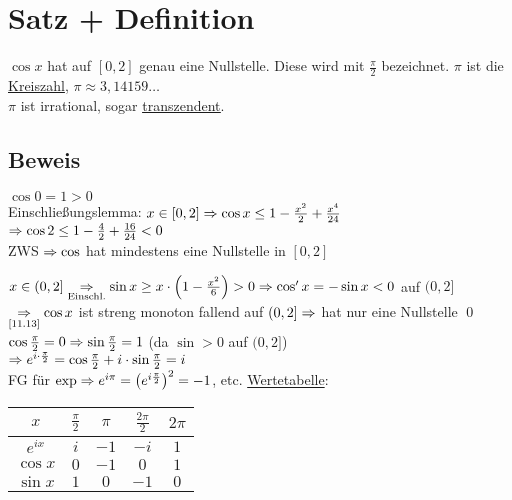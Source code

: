 \section{Satz + Definition}\label{12.1}
$\cos x$ hat auf $[0,2]$ genau eine Nullstelle. Diese wird mit $\frac{\pi}{2}$ bezeichnet.\nl
$\pi$ ist die \underline{Kreiszahl}, $\pi \approx 3,14159\ldots$\\
$\pi$ ist irrational, sogar \href{https://de.wikipedia.org/wiki/Transzendente_Zahl}{\underline{transzendent}}.

\newpage

\subsection*{Beweis}
$\cos 0 = 1 > 0$\\
Einschließungslemma: $x \in [0,2] \Rightarrow \cos x \le 1 - \frac{x^2}{2} + \frac{x^4}{24}$\\
$\Rightarrow \cos 2 \le 1 - \frac{4}{2} + \frac{16}{24} < 0$\\
ZWS $\Rightarrow \cos$ hat mindestens eine Nullstelle in $[0,2]$\nl
{}\nl
$x \in (0,2] \underset{\text{Einschl.}}{\Rightarrow} \sin x \ge x \cdot \left(1-\frac{x^2}{6}\right) > 0 \Rightarrow \cos'x = - \sin x < 0$ auf $(0,2]$\\
$\underset{\text{\ref{11.13}}}{\Rightarrow} \cos x$ ist streng monoton fallend auf $(0,2] \Rightarrow$ hat nur eine Nullstelle \qed\nl
$\cos \frac{\pi}{2} = 0 \Rightarrow \sin \frac{\pi}{2} = 1$ (da $\sin > 0$ auf $(0,2]$)\\
$\Rightarrow e^{i \cdot \frac{\pi}{2}} = \cos \frac{\pi}{2} + i \cdot \sin \frac{\pi}{2} = i$\\
FG für $\exp \Rightarrow e^{i \pi} = \left(e^{i \frac{\pi}{2}}\right)^2 = -1$, etc.\nl
\underline{Wertetabelle}:\\
\begin{tabular}{c||c|c|c|c}
$x$ & $\frac{\pi}{2}$ & $\pi$ & $\frac{2 \pi}{2}$ & $2 \pi$ \\ 
\hline $e^{ix}$ & $i$ & $-1$ & $-i$ & $1$ \\ 
\hline $\cos x$ & $0$ & $-1$ & $0$ & $1$ \\ 
\hline $\sin x$ & $1$ & $0$ & $-1$ & $0$
\end{tabular}\nl
